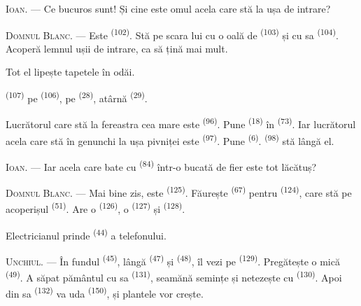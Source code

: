 \textsc{Ioan}. --- Ce bucuros sunt! Și cine este omul acela care stă la ușa de
intrare?

\VUsaut{3.0mm}
\VUsaut{3.0mm}

\textsc{Domnul Blanc}. --- Este  \textsuperscript{(102)}. Stă pe
scara lui cu o oală de  \textsuperscript{(103)} și cu
 sa \textsuperscript{(104)}. Acoperă lemnul ușii de intrare, ca
să țină mai mult.

Tot el lipește tapetele în odăi.

 \textsuperscript{(107)} pe 
\textsuperscript{(106)}, pe  \textsuperscript{(28)}, atârnă
 \textsuperscript{(29)}.

Lucrătorul care stă la fereastra cea mare este 
\textsuperscript{(96)}. Pune  \textsuperscript{(18)} în
 \textsuperscript{(73)}. Iar lucrătorul acela care stă în genunchi la
ușa pivniței este  \textsuperscript{(97)}. Pune
 \textsuperscript{(6)}.  \textsuperscript{(98)} stă
lângă el.

\textsc{Ioan}. --- Iar acela care bate cu 
\textsuperscript{(84)} într-o bucată de fier este tot lăcătuș?

\textsc{Domnul Blanc}. --- Mai bine zis, este 
\textsuperscript{(125)}. Făurește  \textsuperscript{(67)}
pentru  \textsuperscript{(124)}, care stă pe acoperișul
 \textsuperscript{(51)}. Are o 
\textsuperscript{(126)}, o  \textsuperscript{(127)} și
 \textsuperscript{(128)}.

Electricianul prinde  \textsuperscript{(44)} a telefonului.

\VUsaut{3.0mm}

\textsc{Unchiul}. --- În fundul  \textsuperscript{(45)}, lângă
 \textsuperscript{(47)} și  \textsuperscript{(48)},
îl vezi pe  \textsuperscript{(129)}. Pregătește o 
mică \textsuperscript{(49)}. A săpat pământul cu  sa
\textsuperscript{(131)}, seamănă semințe și netezește cu 
\textsuperscript{(130)}. Apoi din  sa \textsuperscript{(132)}
va uda  \textsuperscript{(150)}, și plantele vor crește.

